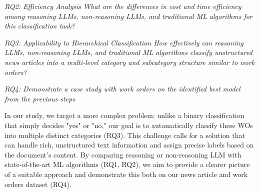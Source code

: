 \bigskip
\textit{RQ2: Efficiency Analysis
\newline
What are the differences in cost and time efficiency among reasoning LLMs, non-reasoning LLMs, and traditional ML algorithms for this classification task?}

\bigskip
\textit{RQ3: Applicability to Hierarchical Classification
\newline
How effectively can reasoning LLMs, non-reasoning LLMs, and traditional ML algorithms classify unstructured news articles into a multi-level category and subcategory structure similar to work orders?}

\bigskip
\textit{RQ4: Demonstrate a case study with work orders on the identified best model from the previous steps} %

 In our study, we target a more complex problem: unlike a binary classification that simply decides "yes" or "no," our goal is to automatically classify these WOs into multiple distinct categories (RQ3). This challenge calls for a solution that can handle rich, unstructured text information and assign precise labels based on the document’s content. By comparing reasoning or non-reasoning LLM with state-of-the-art ML algorithms (RQ1, RQ2), we aim to provide a clearer picture of a suitable approach and demonstrate this both on our news article and work orders dataset (RQ4).